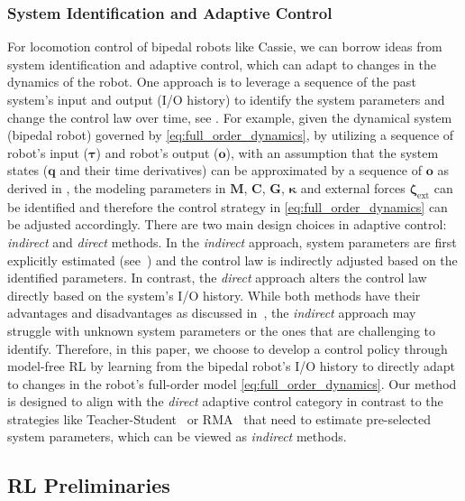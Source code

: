 \subsubsection{System Identification and Adaptive Control}
For locomotion control of bipedal robots like Cassie, we can borrow ideas from system identification and adaptive control, which can adapt to changes in the dynamics of the robot. One approach is to leverage a sequence of the past system's input and output (I/O history) to identify the system parameters and change the control law over time, see \cite[Ch. 9]{landau2011adaptive}. 
For example, given the dynamical system (bipedal robot) governed by \eqref{eq:full_order_dynamics}, by utilizing a sequence of robot's input ($\bm{\tau}$) and robot's output ($\mathbf{o}$), with an assumption that the system states ($\mathbf{q}$ and their time derivatives) can be approximated by a sequence of $\mathbf{o}$ as derived in \cite{lim2023proprioceptive}, the modeling parameters in $\mathbf{M}$, $\mathbf{C}$, $\mathbf{G}$, $\bm{\kappa}$ and external forces $\bm{\zeta}_{\text{ext}}$ can be identified and therefore the control strategy in \eqref{eq:full_order_dynamics} can be adjusted accordingly. 
There are two main design choices in adaptive control: \emph{indirect} and \emph{direct} methods. 
In the \emph{indirect} approach, system parameters are first explicitly estimated (see~\cite{ljung1998system}) and the control law is indirectly adjusted based on the identified parameters. 
In contrast, the \emph{direct} approach alters the control law directly based on the system's I/O history. 
While both methods have their advantages and disadvantages as discussed in~\cite{annaswamy2023adaptive}, the \emph{indirect} approach may struggle with unknown system parameters or the ones that are challenging to identify. 
Therefore, in this paper, we choose to develop a control policy through model-free RL by learning from the bipedal robot's I/O history to directly adapt to changes in the robot's full-order model \eqref{eq:full_order_dynamics}. 
Our method is designed to align with the \emph{direct} adaptive control category in contrast to the strategies like Teacher-Student~\citep{lee2020learning} or RMA~\citep{kumar2021rma} that need to estimate pre-selected system parameters, which can be viewed as \emph{indirect} methods.





\subsection{RL Preliminaries}
